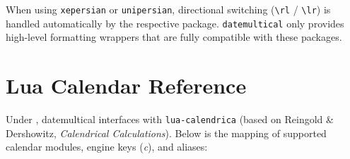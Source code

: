 \documentclass[10pt]{article}
\newcommand{\LuaLaTeXLogo}{\hologo{LuaLaTeX}}
\newcommand{\pkg}[1]{\textsf{#1}}
\begin{document}
    When using \texttt{xepersian} or \texttt{unipersian}, directional switching (\verb|\rl| / \verb|\lr|) is handled automatically by the respective package. \texttt{datemultical} only provides high-level formatting wrappers that are fully compatible with these packages.
    
    
    
    
        \section{Lua Calendar Reference}
    Under \LuaLaTeXLogo{}, \pkg{datemultical} interfaces with \texttt{lua-calendrica}
    (based on Reingold \& Dershowitz, \textit{Calendrical Calculations}). Below is the mapping
    of supported calendar modules, engine keys (\textit{c}), and aliases:
    
\end{document}
